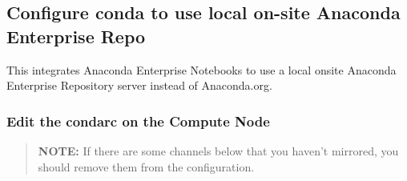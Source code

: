 \documentclass[letterpaper,10pt,openany,oneside]{sphinxmanual}
\begin{document}
\subsection{Configure conda to use local on-site Anaconda Enterprise Repo}
\label{AnacondaEnterpriseNotebooks:configure-conda-to-use-local-on-site-anaconda-enterprise-repo}
This integrates Anaconda Enterprise Notebooks to use a local onsite Anaconda
Enterprise Repository server instead of Anaconda.org.


\subsubsection{Edit the condarc on the Compute Node}
\label{AnacondaEnterpriseNotebooks:edit-the-condarc-on-the-compute-node}\begin{quote}

\textbf{NOTE:} If there are some channels below that you haven't mirrored,
you should remove them from the configuration.
\end{quote}
\end{document}

